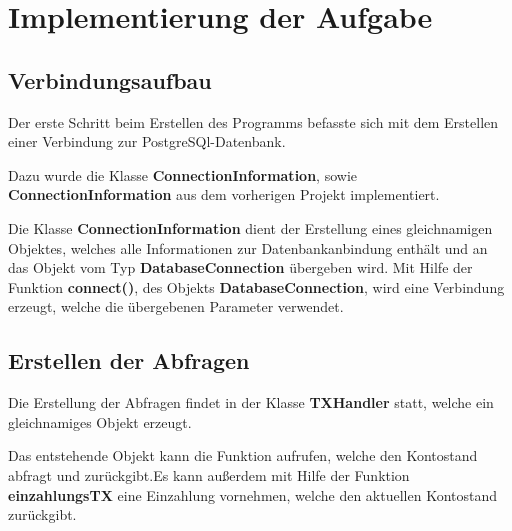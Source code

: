 \section{Implementierung der Aufgabe}

\subsection{Verbindungsaufbau}
Der erste Schritt beim Erstellen des Programms befasste sich mit dem Erstellen
einer Verbindung zur PostgreSQl-Datenbank. 

Dazu wurde die Klasse \textbf{ConnectionInformation}, sowie
\textbf{ConnectionInformation} aus dem vorherigen Projekt implementiert. 

Die Klasse \textbf{ConnectionInformation} dient der Erstellung eines gleichnamigen
Objektes, welches alle Informationen zur Datenbankanbindung enthält und an das
Objekt vom Typ \textbf{DatabaseConnection} übergeben wird. Mit Hilfe der Funktion
\textbf{connect()}, des Objekts \textbf{DatabaseConnection}, wird eine Verbindung
erzeugt, welche die übergebenen Parameter verwendet.

\subsection{Erstellen der Abfragen}
Die Erstellung der Abfragen findet in der Klasse \textbf{TXHandler} statt, welche
ein gleichnamiges Objekt erzeugt. 

Das entstehende Objekt kann die Funktion  aufrufen, welche den
Kontostand abfragt und zurückgibt.Es kann außerdem mit Hilfe der Funktion
\textbf{einzahlungsTX} eine Einzahlung vornehmen, welche den aktuellen
Kontostand zurückgibt.

